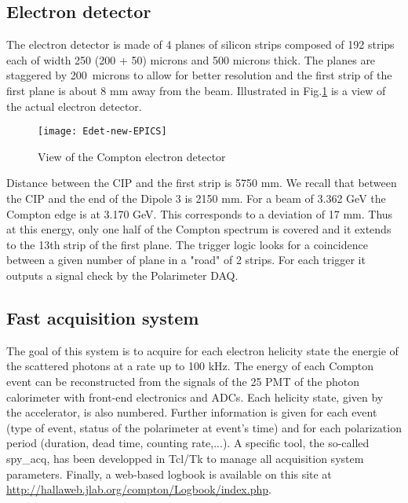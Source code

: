 {\subsection{Electron detector}
\label{sec:compton_edet}

The electron detector is made of 4 planes of silicon strips composed
of 192 strips each of width 250 (200 + 50) microns and 500 microns
thick. The planes are staggered by 200~microns to allow for better
resolution and the first strip of the first plane is about 8 mm away from the
beam. Illustrated in Fig.\ref{fig:compton_edet} is a view of the actual electron detector.
 \begin{figure}[htp]
    \begin{center}
        \texttt{[image: Edet-new-EPICS]}
    \end{center}
    \caption[compton:electron detector]{
            View of the Compton electron detector
            }
    \label{fig:compton_edet}
 \end{figure}

Distance between the CIP and the first strip is 5750 mm. We recall that
between the CIP and the end of the Dipole 3 is 2150 mm.
For a beam of 3.362 GeV the Compton
edge is at 3.170 GeV. This corresponds to a deviation of 17 mm. Thus at
this energy, only one half of the Compton spectrum is covered and it extends
to the 13th strip of the first plane.
The trigger logic looks for a coincidence
between a given number of plane in a "road" of 2 strips. For each trigger
it outputs a signal check by the Polarimeter DAQ.

\subsection{Fast acquisition system}
\label{sec:compton_daq}
The goal of this system is to acquire
for each electron helicity state the energie of the scattered photons at a
rate up to 100 kHz. The energy of each Compton event can be
reconstructed from the signals of the 25 PMT of the photon calorimeter
with front-end electronics and ADCs. Each helicity state, given
by the accelerator, is also numbered.
Further information is given for each
event (type of event, status of the polarimeter at event's time) and for
each polarization period (duration, dead time, counting rate,...).
A specific tool, the so-called spy\_acq, has been developped in Tcl/Tk
to manage all acquisition system parameters. Finally, a web-based logbook
is available on this site at \url{http://hallaweb.jlab.org/compton/Logbook/index.php}.

} %

